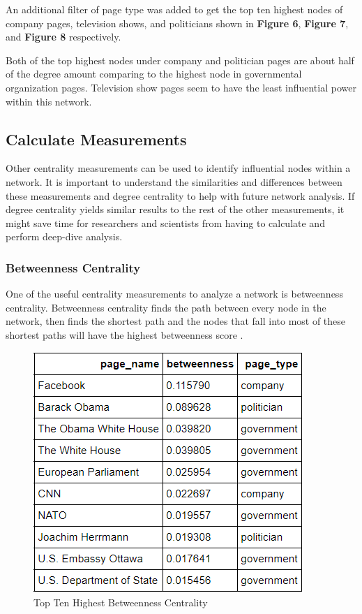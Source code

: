 \documentclass[11pt,twocolumn]{article}
\begin{document}
An additional filter of page type was added to get the top ten highest nodes of company pages, television shows, and politicians shown in \textbf{Figure 6}, \textbf{Figure 7}, and \textbf{Figure 8} respectively.  

Both of the top highest nodes under company and politician pages are about half of the degree amount comparing to the highest node in governmental organization pages. Television show pages seem to have the least influential power within this network.

\subsection{Calculate Measurements }
Other centrality measurements can be used to identify influential nodes within a network. It is important to understand the similarities and differences between these measurements and degree centrality to help with future network analysis. If degree centrality yields similar results to the rest of the other measurements, it might save time for researchers and scientists from having to calculate and perform deep-dive analysis.

\subsubsection{Betweenness Centrality} 
One of the useful centrality measurements to analyze a network is betweenness centrality. Betweenness centrality finds the path between every node in the network, then finds the shortest path and the nodes that fall into most of these shortest paths will have the highest betweenness score \cite{newman2008mathematics}. 

\begin{figure}[hbt!]
\includegraphics[scale=0.5]{top_ten_betweennness.png} 
\caption{Top Ten Highest Betweenness Centrality}
\end{figure}
\end{document}
